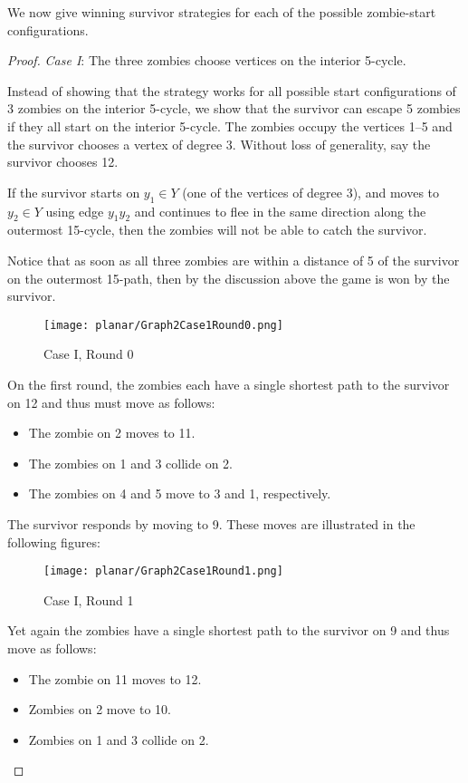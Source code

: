 We now give winning survivor strategies for each of the possible zombie-start configurations.

\begin{proof}
\textit{Case I}: The three zombies choose vertices on the interior 5-cycle.

Instead of showing that the strategy works for all possible start configurations of 3 zombies on the interior 5-cycle,
we show that the survivor can escape 5 zombies if they all start on the interior 5-cycle.
The zombies occupy the vertices 1--5 and the survivor chooses a vertex of degree 3.
Without loss of generality, say the survivor chooses 12.

If the survivor starts on $y_1 \in Y$ (one of the vertices of degree 3), and moves to $y_2\in Y$ using edge $y_1y_2$ and continues to flee in the same direction along the outermost 15-cycle, then the zombies will not be able to catch the survivor.

Notice that as soon as all three zombies are within a distance of 5 of the survivor on the outermost 15-path, then by the discussion above
 the game is won by the survivor.

\begin{figure}
\centering
\texttt{[image: planar/Graph2Case1Round0.png]}
\caption{Case I, Round 0\label{fig:planarG2C1R0}}
\end{figure}

On the first round, the zombies each have a single shortest path to the survivor on 12 and thus must move as follows:

\begin{itemize}
\item The zombie on 2 moves to 11.
\item The zombies on 1 and 3 collide on 2.
\item The zombies on 4 and 5 move to 3 and 1, respectively.
\end{itemize}

The survivor responds by moving to 9. These moves are illustrated in the following figures:
\begin{figure}
\centering
\texttt{[image: planar/Graph2Case1Round1.png]}
\caption{Case I, Round 1\label{fig:planarG2C1R1}}
\end{figure}

\newpage

Yet again the zombies have a single shortest path to the survivor on 9 and thus move as follows:
\begin{itemize}
\item The zombie on 11 moves to 12.
\item Zombies on 2 move to 10.
\item Zombies on 1 and 3 collide on 2.
\end{itemize}


\end{proof}

